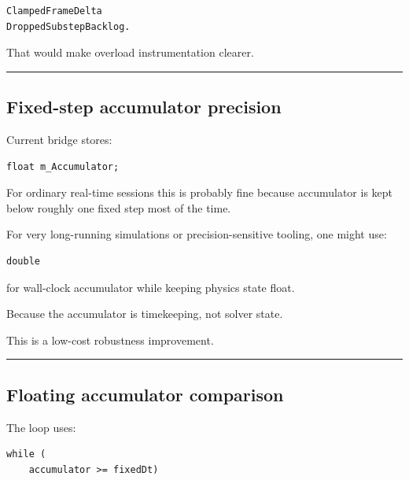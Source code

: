 \begin{verbatim}
ClampedFrameDelta
DroppedSubstepBacklog.
\end{verbatim}

That would make overload instrumentation clearer.

\begin{center}\rule{0.5\linewidth}{0.5pt}\end{center}

\subsection{Fixed-step accumulator precision}\label{06-engine-ii-ch038-fixed-step-accumulator-precision}

\hypertarget{06-engine-ii-ch038-fixed-step-accumulator-precision}{}

Current bridge stores:

\begin{verbatim}
float m_Accumulator;
\end{verbatim}

For ordinary real-time sessions this is probably fine because accumulator is kept below roughly one fixed step most of the time.

For very long-running simulations or precision-sensitive tooling, one might use:

\begin{verbatim}
double
\end{verbatim}

for wall-clock accumulator while keeping physics state float.

Because the accumulator is timekeeping, not solver state.

This is a low-cost robustness improvement.

\begin{center}\rule{0.5\linewidth}{0.5pt}\end{center}

\subsection{Floating accumulator comparison}\label{06-engine-ii-ch038-floating-accumulator-comparison}

\hypertarget{06-engine-ii-ch038-floating-accumulator-comparison}{}

The loop uses:

\begin{verbatim}
while (
    accumulator >= fixedDt)
\end{verbatim}

